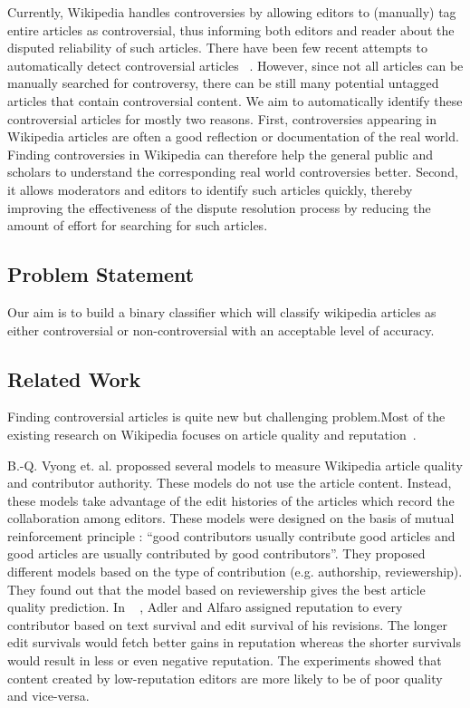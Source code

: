 \documentclass[twocolumn]{article}
\begin{document}
	Currently, Wikipedia handles controversies by allowing editors
        to (manually) tag entire articles as controversial, thus
        informing both editors and reader about the disputed
        reliability of such articles. There have been few recent
        attempts to automatically detect controversial articles
        ~\cite{Kittur, conf/wsdm/VuongLSLL08, conf/ht/RadMRB12}. However, since not all articles can be manually searched for controversy, there can be still many potential untagged articles that contain controversial content. We aim to automatically identify these controversial articles for mostly two reasons. First, controversies appearing in Wikipedia articles are often a good reflection or documentation of the real world. Finding controversies in Wikipedia can therefore help the general public and scholars to understand the corresponding real world controversies better. Second, it allows moderators and editors to identify such articles quickly, thereby improving the effectiveness of the dispute resolution process by reducing the amount of effort for searching for such articles. \\

\subsection{Problem Statement}

Our aim is to build a binary classifier which will classify wikipedia articles as either controversial or non-controversial with an acceptable level of accuracy.

\subsection{Related Work}

  Finding controversial articles is quite new but challenging
problem.Most of the existing research on Wikipedia focuses on article
quality and
reputation~\cite{AdlAlf2007,anthony2005eqi,conf/cikm/HuLSLV07,conf/webi/LimVLS06,conf/pst/ZengADFM06}.

  B.-Q. Vyong et. al. propossed several models to measure Wikipedia
  article quality and contributor authority. These models do not use
  the article content. Instead, these models take advantage of the
  edit histories of the articles which record the collaboration among
  editors. These models were designed on the basis of mutual
  reinforcement principle : ``good contributors usually contribute
  good articles and good articles are usually contributed by good
  contributors''. They proposed different models based on the type of
  contribution (e.g. authorship, reviewership). They found out that
  the model based on reviewership gives the best article quality
  prediction. In ~\cite{AdlAlf2007} , Adler and Alfaro assigned
  reputation to every contributor based on text survival and edit
  survival of his revisions. The longer edit survivals would fetch
  better gains in reputation whereas the shorter survivals would
  result in less or even negative reputation. The experiments showed
  that content created by low-reputation editors are more likely to be
  of poor quality and vice-versa.
\end{document}
